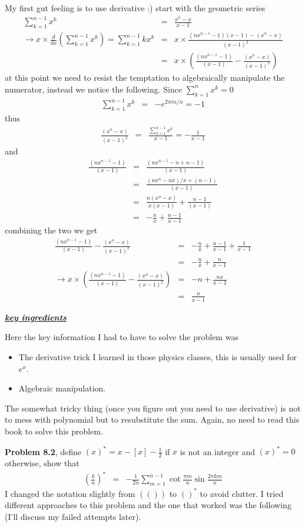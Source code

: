 \documentclass[aps,preprint,preprintnumbers,nofootinbib,showpacs,prd]{revtex4-1}
\newcommand{\bit}{\begin{itemize}}
\newcommand{\eit}{\end{itemize}}
\newcommand{\nbea}{\begin{eqnarray*}}
\newcommand{\neea}{\end{eqnarray*}}
\begin{document}
My first gut feeling is to use derivative :) start with the geometric series
%
\nbea
\sum_{k=1}^{n-1} x^k & = & \frac{x^n-x}{x-1} \\
\to x \times \frac{d}{dx} \left ( \sum_{k=1}^{n-1} x^k\right ) = \sum_{k=1}^{n-1}kx^k & = & x \times \frac{(nx^{n-1}-1)(x-1) - (x^n-x)}{(x-1)^2} \\
& = & x \times \left ( \frac{(nx^{n-1}-1)}{(x-1)} - \frac{(x^n-x)}{(x-1)^2} \right )
\neea
%
at this point we need to resist the temptation to algebraically manipulate the numerator, instead we notice the following. Since $\sum_{k=1}^{n} x^k = 0$
%
\nbea
\sum_{k=1}^{n-1} x^k & = & -e^{2\pi i n/n} = -1
\neea
%
thus 
%
\nbea
\frac{(x^n-x)}{(x-1)^2} & = & \frac{\sum_{k=1}^{n-1} x^k }{x-1} = -\frac{1}{x-1}
\neea
%
and
%
\nbea
\frac{(nx^{n-1}-1)}{(x-1)} & = & \frac{(nx^{n-1}-n + n - 1)}{(x-1)} \\
& = & \frac{(nx^{n}-nx)/x + (n-1)}{(x-1)} \\
& = & \frac{n(x^{n}-x)}{x(x-1)} + \frac{n-1}{(x-1)} \\
& = & -\frac{n}{x} + \frac{n-1}{x-1}
\neea
%
combining the two we get
%
\nbea
\frac{(nx^{n-1}-1)}{(x-1)} - \frac{(x^n-x)}{(x-1)^2} & = & -\frac{n}{x} + \frac{n-1}{x-1} + \frac{1}{x-1} \\
& = & -\frac{n}{x} + \frac{n}{x-1} \\
\to x \times \left (\frac{(nx^{n-1}-1)}{(x-1)} - \frac{(x^n-x)}{(x-1)^2} \right ) & = & -n + \frac{nx}{x-1} \\
& = & \frac{n}{x-1}
\neea
%

\smallskip
\underline{\textit{\textbf{key ingredients}}}
\smallskip

Here the key information I had to have to solve the problem was
\vspace{-\topsep}
%
\bit
\setlength\itemsep{-1.0em}
\item The derivative trick I learned in those physics classes, this is usually used for $e^x$.
\item Algebraic manipulation.
\eit
%
\vspace{-\topsep}
The somewhat tricky thing (once you figure out you need to use derivative) is not to mess with polynomial but to resubstitute the sum. Again, no need to read this book to solve this problem.

{\bf Problem 8.2}, define $(x)^* = x - [x] - \frac{1}{2}$ if $x$ is not an integer and $(x)^* = 0$ otherwise, show that
%
\nbea
\left ( \frac{k}{n} \right )^* & = & -\frac{1}{2n} \sum_{m=1}^{n-1} \cot\frac{\pi m}{n} \sin \frac{2\pi k m}{n}
\neea
%
I changed the notation slightly from $(())$ to $()^*$ to avoid clutter. I tried different approaches to this problem and the one that worked was the following (I'll discuss my failed attempts later).
\end{document}

